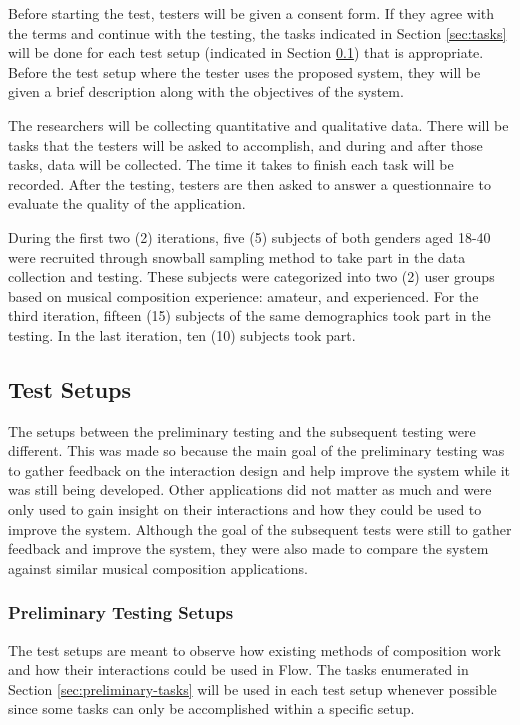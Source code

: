 Before starting the test, testers will be given a consent form. If they agree with the terms and continue with the testing, the tasks indicated in Section \ref{sec:tasks} will be done for each test setup (indicated in Section \ref{sec:test-setups}) that is appropriate. Before the test setup where the tester uses the proposed system, they will be given a brief description along with the objectives of the system. 

The researchers will be collecting quantitative and qualitative data. There will be tasks that the testers will be asked to accomplish, and during and after those tasks, data will be collected. The time it takes to finish each task will be recorded. After the testing, testers are then asked to answer a questionnaire to evaluate the quality of the application.

During the first two (2) iterations, five (5) subjects of both genders aged 18-40 were recruited through snowball sampling method to take part in the data collection and testing. These subjects were categorized into two (2) user groups based on musical composition experience: amateur, and experienced. For the third iteration, fifteen (15) subjects of the same demographics took part in the testing. In the last iteration, ten (10) subjects took part. 

\subsection{Test Setups}
\label{sec:test-setups}

The setups between the preliminary testing and the subsequent testing were different. This was made so because the main goal of the preliminary testing was to gather feedback on the interaction design and help improve the system while it was still being developed. Other applications did not matter as much and were only used to gain insight on their interactions and how they could be used to improve the system. Although the goal of the subsequent tests were still to gather feedback and improve the system, they were also made to compare the system against similar musical composition applications. 

\subsubsection{Preliminary Testing Setups}

The test setups are meant to observe how existing methods of composition work and how their interactions could be used in Flow. The tasks enumerated in Section \ref{sec:preliminary-tasks} will be used in each test setup whenever possible since some tasks can only be accomplished within a specific setup. 

